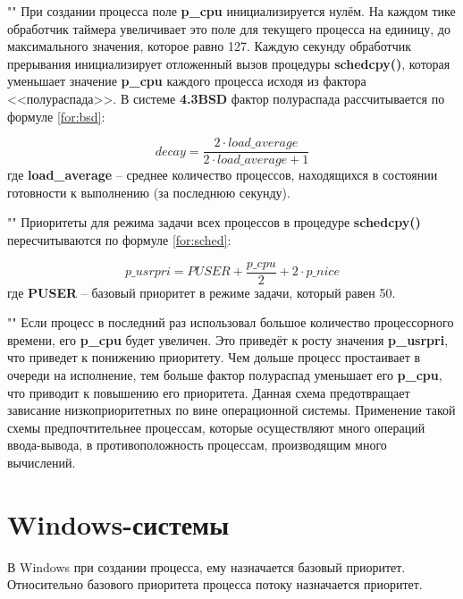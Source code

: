 ""\newline 
\noindent При создании процесса поле \textbf{p\_cpu} инициализируется нулём. На каждом тике обработчик таймера увеличивает это поле для текущего процесса на единицу, до максимального значения, которое равно 127. Каждую секунду обработчик прерывания инициализирует отложенный вызов процедуры \textbf{schedcpy()}, которая уменьшает значение \textbf{p\_cpu} каждого процесса исходя из фактора <<полураспада>>. В системе \textbf{4.3BSD} фактор полураспада рассчитывается по формуле \eqref{for:bsd}: 

\begin{equation}
    \label{for:bsd}
    decay = \frac{2 \cdot load\_average}{2 \cdot load\_average + 1}
\end{equation}
где \textbf{load\_average} -- среднее количество процессов, находящихся в состоянии готовности к выполнению (за последнюю секунду).

""\newline
\noindent Приоритеты для режима задачи всех процессов в процедуре \textbf{schedcpy()} пересчитываются по формуле \eqref{for:sched}:

\begin{equation}
    \label{for:sched}
    p\_usrpri = PUSER + \frac{p\_cpu}{2} + 2 \cdot p\_nice
\end{equation}
где \textbf{PUSER} -- базовый приоритет в режиме задачи, который равен 50.

""\newline 
\noindent Если процесс в последний раз использовал большое количество процессорного времени, его \textbf{p\_cpu} будет увеличен. Это приведёт к росту значения \textbf{p\_usrpri}, что приведет к понижению приоритету. Чем дольше процесс простаивает в очереди на исполнение, тем больше фактор полураспад уменьшает его \textbf{p\_cpu}, что приводит к повышению его приоритета. Данная схема предотвращает зависание низкоприоритетных по вине операционной системы. Применение такой схемы предпочтительнее процессам, которые осуществляют много операций ввода-вывода, в противоположность процессам, производящим много вычислений.

\section{Windows-системы}

\noindent В Windows при создании процесса, ему назначается базовый приоритет. Относительно базового приоритета процесса потоку назначается приоритет.

